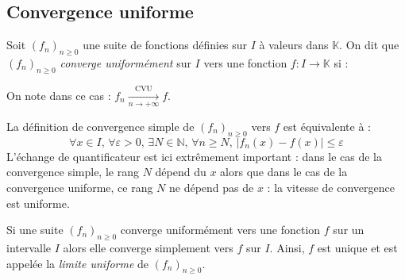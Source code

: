 \documentclass[a4paper,10pt]{report}
\begin{document}
\subsection{Convergence uniforme}

\begin{Definition}{} Soit $(f_n)_{n \geq 0}$ une suite de fonctions définies sur $I$ à valeurs dans $\mathbb{K}$. On dit que $(f_n)_{n \geq 0}$ \emph{converge uniformément} sur $I$ vers une fonction $f : I \rightarrow \mathbb{K}$ si : 
$$\phantom{\forall \varepsilon >0, \, \exists N \in \mathbb{N}, \, \forall n \geq N, \, \forall x \in I, \, \vert f_n(x)-f(x) \vert \leq \varepsilon}$$
On note dans ce cas : $f_n \xrightarrow[n \rightarrow + \infty]{\textrm{CVU}} f$.
\end{Definition}

%


\begin{Remarque}{} 
La définition de convergence simple de $(f_n)_{n \geq 0}$ vers $f$ est équivalente à :
$$ \forall x \in I, \,  \forall \varepsilon >0, \, \exists N \in \mathbb{N}, \, \forall n \geq N,  \, \vert f_n(x)-f(x) \vert \leq \varepsilon$$
L'échange de quantificateur est ici extrêmement important : dans le cas de la convergence simple, le rang $N$ dépend du $x$ alors que dans le cas de la convergence uniforme, ce rang $N$ ne dépend pas de $x$ : la \og vitesse \fg de convergence est uniforme.
\end{Remarque}

\begin{Proposition}{}  Si une suite $(f_n)_{n \geq 0}$ converge uniformément vers une fonction $f$ sur un intervalle $I$ alors elle converge simplement vers $f$ sur $I$. Ainsi, $f$ est unique et est appelée la \emph{limite uniforme} de $(f_n)_{n \geq 0}$.
\end{Proposition}
\begin{Demonstration}{}
\vspace{5cm}
\end{Demonstration}
\end{document}
